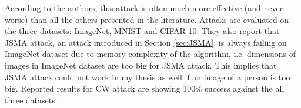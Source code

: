 According to the authors, this attack is often much more effective (and never worse) than all the others presented in the literature. Attacks are evaluated on the three datasets: ImageNet, MNIST and CIFAR-10. They also report that JSMA attack, an attack introduced in Section \ref{sec:JSMA}, is always failing on ImageNet dataset due to memory complexity of the algorithm, i.e. dimensions of images in ImageNet dataset are too big for JSMA attack. This implies that JSMA attack could not work in my thesis as well if an image of a person is too big. Reported results for CW attack are showing 100\% success against the all three datasets.







